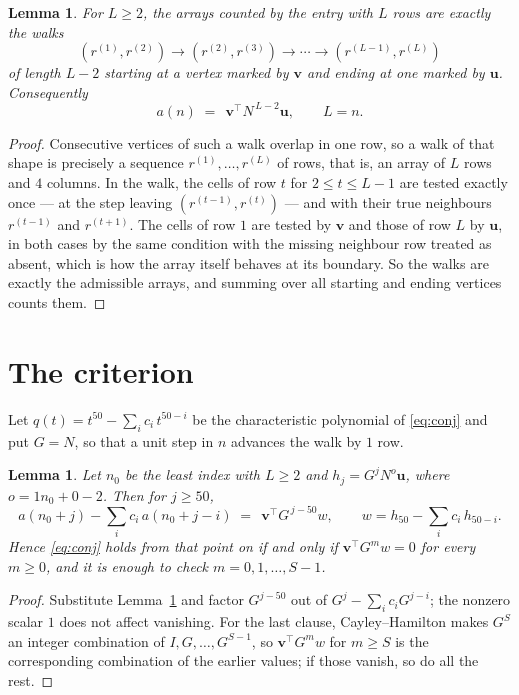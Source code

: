\documentclass[11pt,a4paper]{article}
\theoremstyle{plain}
\newtheorem{lemma}[theorem]{Lemma}
\theoremstyle{definition}
\begin{document}
\begin{lemma}\label{lem:walk}
For $L\ge2$, the arrays counted by the entry with $L$ rows are exactly the walks
\[
(r^{(1)},r^{(2)})\to(r^{(2)},r^{(3)})\to\cdots\to(r^{(L-1)},r^{(L)})
\]
of length $L-2$ starting at a vertex marked by $\mathbf{v}$ and ending at one marked by
$\mathbf{u}$. Consequently
\[
a(n)\;=\;\,\mathbf{v}^{\!\top}N^{\,L-2}\mathbf{u},\qquad L=n .
\]
\end{lemma}

\begin{proof}
Consecutive vertices of such a walk overlap in one row, so a walk of that shape is
precisely a sequence $r^{(1)},\dots,r^{(L)}$ of rows, that is, an array of $L$ rows
and $4$ columns. In the walk, the cells of row $t$ for $2\le t\le L-1$ are tested
exactly once --- at the step leaving $(r^{(t-1)},r^{(t)})$ --- and with their true
neighbours $r^{(t-1)}$ and $r^{(t+1)}$. The cells of row $1$ are tested by
$\mathbf{v}$ and those of row $L$ by $\mathbf{u}$, in both cases by the same condition
with the missing neighbour row treated as absent, which is how the array itself behaves at
its boundary. So the walks are exactly the admissible arrays, and summing over all starting
and ending vertices counts them.
\end{proof}

\section{The criterion}

Let $q(t)=t^{50}-\sum_i c_i\,t^{50-i}$ be the characteristic polynomial of
\eqref{eq:conj} and put $G=N$, so that a unit step in $n$ advances the walk by
$1$ row.

\begin{lemma}\label{lem:crit}
Let $n_0$ be the least index with $L\ge2$ and $h_j=G^{j}N^{o}\mathbf{u}$, where
$o=1n_0+0-2$. Then for $j\ge50$,
\[
a(n_0+j)-\sum_i c_i\,a(n_0+j-i)\;=\;\,\mathbf{v}^{\!\top}G^{\,j-50}w,
\qquad w=h_{50}-\sum_i c_i\,h_{50-i} .
\]
Hence \eqref{eq:conj} holds from that point on if and only if
$\mathbf{v}^{\!\top}G^{m}w=0$ for every $m\ge0$, and it is enough to check
$m=0,1,\dots,S-1$.
\end{lemma}

\begin{proof}
Substitute Lemma~\ref{lem:walk} and factor $G^{j-50}$ out of
$G^{j}-\sum_ic_iG^{j-i}$; the nonzero scalar $1$ does not affect
vanishing. For the last clause, Cayley--Hamilton makes $G^{S}$ an integer combination of
$I,G,\dots,G^{S-1}$, so $\mathbf{v}^{\!\top}G^{m}w$ for $m\ge S$ is the corresponding
combination of the earlier values; if those vanish, so do all the rest.
\end{proof}
\end{document}
